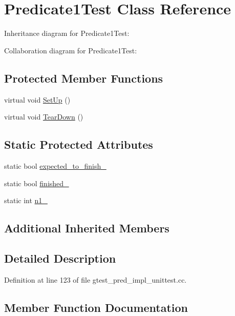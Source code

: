 \hypertarget{class_predicate1_test}{}\section{Predicate1\+Test Class Reference}
\label{class_predicate1_test}


Inheritance diagram for Predicate1\+Test\+:


Collaboration diagram for Predicate1\+Test\+:
\subsection*{Protected Member Functions}
\begin{DoxyCompactItemize}
\item 
virtual void \hyperlink{class_predicate1_test_a481704a09f73a37158513f9a336dbdd9}{Set\+Up} ()
\item 
virtual void \hyperlink{class_predicate1_test_ad2974af5c6abc508847c3a9912b24a90}{Tear\+Down} ()
\end{DoxyCompactItemize}
\subsection*{Static Protected Attributes}
\begin{DoxyCompactItemize}
\item 
static bool \hyperlink{class_predicate1_test_ad91cfa58e6352d53abacce32df2ef635}{expected\+\_\+to\+\_\+finish\+\_\+}
\item 
static bool \hyperlink{class_predicate1_test_a6d45fb2d1f01a5c8baf28f60039c244e}{finished\+\_\+}
\item 
static int \hyperlink{class_predicate1_test_a528d9f7f618b17802962a3824eea11e3}{n1\+\_\+}
\end{DoxyCompactItemize}
\subsection*{Additional Inherited Members}


\subsection{Detailed Description}


Definition at line 123 of file gtest\+\_\+pred\+\_\+impl\+\_\+unittest.\+cc.



\subsection{Member Function Documentation}

